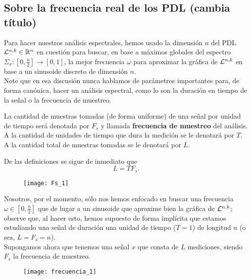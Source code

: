 \subsection{Sobre la frecuencia real de los PDL (cambia título)}

Para hacer nuestros análisis espectrales, hemos
usado la dimensión $n$ del PDL $\mathcal{L}^{n, k} \in \mathbb{R}^{n}$
en cuestión
para buscar, en base a máximos globales
del espectro 
$\Sigma_{x}: [0, \frac{n}{2}] \longrightarrow [0,1]$, la
mejor frecuencia $\omega$ para aproximar la gráfica
de $\mathcal{L}^{n,k}$ en base a un sinusoide discreto
de dimensión $n$. \\


Note que en esa discusión nunca hablamos de 
parámetros importantes para, de forma canónica, hacer
un análisis espectral, como lo son la
duración en tiempo de la señal o la frecuencia
de muestreo.

\begin{defi}
\label{def: tiempo y frec de muestreo}
La cantidad de muestras tomadas (de forma uniforme)
de una señal por unidad de tiempo 
será denotada por $F_{s}$ y llamada \textbf{frecuencia
de muestreo} del análisis. A la cantidad de unidades de
tiempo que dura la medición se le denotará por $T$. \\

A la cantidad total de muestras tomadas se le denotará
por $L$.
\end{defi}

De las definiciones se sigue de inmediato que
\begin{equation}
\label{eq: relacion L, T Fs}
L = T F_{s}.
\end{equation}
\begin{figure}[H]
	\centering
	\texttt{[image: Fs\_1]} 
\end{figure}	

Nosotros, por el momento, sólo nos
hemos enfocado en buscar
una frecuencia $\omega \in [0, \frac{n}{2}]$ que de lugar
a un sinusoide que aproxime bien la gráfica
de $\mathcal{L}^{n,k}$;
observe que, al hacer esto, hemos supuesto de forma
implícita que estamos estudiando una señal
de duración una unidad de tiempo
($T = 1$) de longitud $n$
(o sea, $L = F_{s} = n$). \\
Supongamos ahora que
tenemos una señal $x$ que consta de $L$ mediciones, siendo
$F_{s}$ la frecuencia de muestreo.
\begin{figure}[H]
	\centering
	\texttt{[image: frecuencia\_1]} 
\end{figure}	

